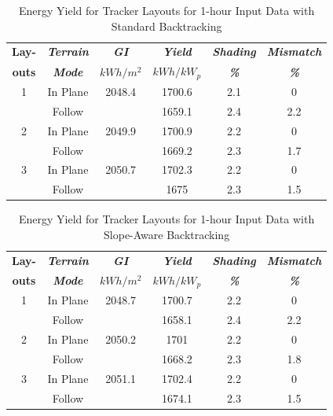\documentclass[conference]{IEEEtran}
\begin{document}
\begin{table}[htbp]
\caption{Energy Yield for Tracker Layouts for 1-hour Input Data with Standard Backtracking}
\begin{center}
\begin{tabular}{|c|c|c|c|c|c|}
\hline
\textbf{Lay-}& \textbf{\textit{Terrain}}& \textbf{\textit{GI}}&        \textbf{\textit{Yield}}&        \textbf{\textit{Shading}}& \textbf{\textit{Mismatch}} \\
\textbf{outs}& \textbf{\textit{Mode}}&    \textbf{\textit{$kWh/m^2$}}& \textbf{\textit{$kWh / kW_p$}}& \textbf{\textit{\%}}&      \textbf{\textit{\%}} \\
\hline
1& In Plane& 2048.4&  1700.6& 2.1& 0 \\
 & Follow&         &  1659.1& 2.4& 2.2 \\
\hline
2& In Plane& 2049.9&  1700.9& 2.2& 0 \\
 & Follow&         &  1669.2& 2.3& 1.7 \\
\hline
3& In Plane& 2050.7&  1702.3& 2.2& 0 \\
 & Follow&         &  1675&   2.3& 1.5 \\
\hline
\end{tabular}
\label{table:standard-1hr}
\end{center}
\end{table}


\begin{table}[htbp]
\caption{Energy Yield for Tracker Layouts for 1-hour Input Data with Slope-Aware Backtracking}
\begin{center}
\begin{tabular}{|c|c|c|c|c|c|}
\hline
\textbf{Lay-}& \textbf{\textit{Terrain}}& \textbf{\textit{GI}}&        \textbf{\textit{Yield}}&        \textbf{\textit{Shading}}& \textbf{\textit{Mismatch}} \\
\textbf{outs}& \textbf{\textit{Mode}}&    \textbf{\textit{$kWh/m^2$}}& \textbf{\textit{$kWh / kW_p$}}& \textbf{\textit{\%}}&      \textbf{\textit{\%}} \\
\hline
1& In Plane& 2048.7&  1700.7& 2.2& 0 \\
 & Follow&         &  1658.1& 2.4& 2.2 \\
\hline
2& In Plane& 2050.2&  1701&   2.2& 0 \\
 & Follow&         &  1668.2& 2.3& 1.8 \\
\hline
3& In Plane& 2051.1&  1702.4& 2.2& 0 \\
 & Follow&         &  1674.1& 2.3& 1.5 \\
\hline
\end{tabular}
\label{table:slope-1hr}
\end{center}
\end{table}
\end{document}
